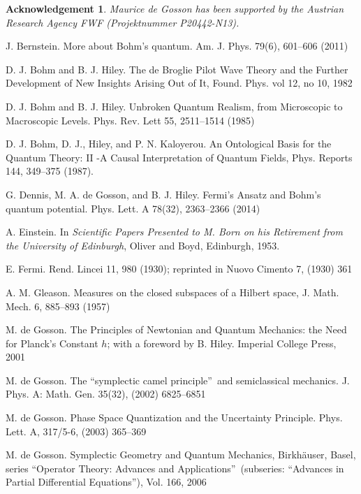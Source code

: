 \documentclass[11pt]{article}%
\newtheorem{acknowledgement}[theorem]{Acknowledgement}
\begin{document}
\begin{acknowledgement}
Maurice de Gosson has been supported by the Austrian Research Agency FWF
(Projektnummer P20442-N13).
\end{acknowledgement}

\begin{thebibliography}{99}                                                                                               %


J. Bernstein. More about Bohm's quantum. Am. J. Phys.
79(6), 601--606 (2011)

D. J. Bohm and B. J. Hiley. The de Broglie Pilot Wave
Theory and the Further Development of New Insights Arising Out of It, Found.
Phys. vol 12, no 10, 1982

D. J. Bohm and B. J. Hiley. Unbroken Quantum Realism, from
Microscopic to Macroscopic Levels. Phys. Rev. Lett 55, 2511--1514 (1985)

D. J. Bohm, D. J., Hiley, and P. N. Kaloyerou. An
Ontological Basis for the Quantum Theory: II -A Causal Interpretation of
Quantum Fields, Phys. Reports 144, 349--375 (1987).

G. Dennis, M. A. de Gosson, and B. J. Hiley. Fermi's Ansatz
and Bohm's quantum potential. Phys. Lett. A 78(32), 2363--2366 (2014)

A. Einstein. In \emph{Scientific Papers Presented to M. Born on
his Retirement from the University of Edinburgh}, Oliver and Boyd, Edinburgh, 1953.

E. Fermi. Rend. Lincei 11, 980 (1930); reprinted in Nuovo
Cimento 7, (1930) 361

A. M. Gleason. Measures on the closed subspaces of a Hilbert
space, J. Math. Mech. 6, 885--893 (1957)

M. de Gosson. The Principles of Newtonian and Quantum Mechanics:
the Need for Planck's Constant $h$; with a foreword by B. Hiley. Imperial
College Press, 2001

M. de Gosson. The \textquotedblleft symplectic camel
principle\textquotedblright\ and semiclassical mechanics. J. Phys. A: Math.
Gen. 35(32), (2002) 6825--6851

M. de Gosson. Phase Space Quantization and the Uncertainty
Principle. Phys. Lett. A, 317/5-6, (2003) 365--369

M. de Gosson. Symplectic Geometry and Quantum Mechanics,
Birkh\"{a}user, Basel, series \textquotedblleft Operator Theory: Advances and
Applications\textquotedblright\ (subseries: \textquotedblleft Advances in
Partial Differential Equations\textquotedblright), Vol. 166, 2006


\end{thebibliography}
\end{document}
